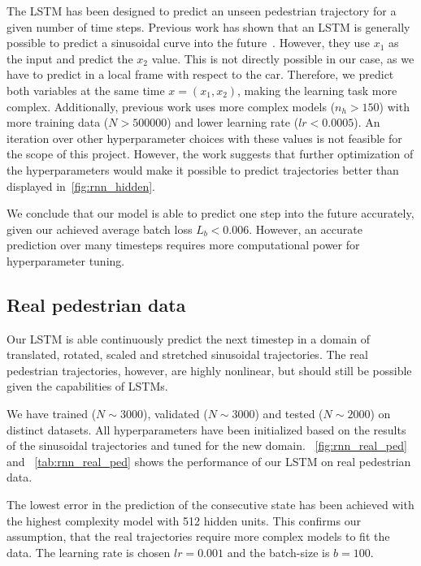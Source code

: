 The LSTM has been designed to predict an unseen pedestrian trajectory for a given number of time steps.
Previous work has shown that an LSTM is generally possible to predict a sinusoidal curve into the future~\cite{sunsided}.
However, they use $x_1$ as the input and predict the $x_2$ value.
This is not directly possible in our case, as we have to predict in a local frame with respect to the car.
Therefore, we predict both variables at the same time $x = (x_1, x_2)$, making the learning task more complex.
Additionally, previous work uses more complex models ($n_h>150$) with more training data ($N>500000$) and lower learning rate ($lr<0.0005$).
An iteration over other hyperparameter choices with these values is not feasible for the scope of this project.
However, the work suggests that further optimization of the hyperparameters would make it possible to predict trajectories better than displayed in~\cref{fig:rnn_hidden}.

We conclude that our model is able to predict one step into the future accurately, given our achieved average batch loss $L_b<0.006$.
However, an accurate prediction over many timesteps requires more computational power for hyperparameter tuning. 

\subsection{Real pedestrian data}

Our LSTM is able continuously predict the next timestep in a domain of translated, rotated, scaled and stretched sinusoidal trajectories.
The real pedestrian trajectories, however, are highly nonlinear, but should still be possible given the capabilities of LSTMs.

We have trained ($N\sim3000$), validated ($N\sim3000$) and tested ($N\sim2000$) on distinct datasets.
All hyperparameters have been initialized based on the results of the sinusoidal trajectories and tuned for the new domain. ~\cref{fig:rnn_real_ped} and ~\cref{tab:rnn_real_ped} shows the performance of our LSTM on real pedestrian data. 
 
The lowest error in the prediction of the consecutive state has been achieved with the highest complexity model with 512 hidden units. This confirms our assumption, that the real trajectories require more complex models to fit the data. The learning rate is chosen $lr=0.001$ and the batch-size is $b=100$. 

